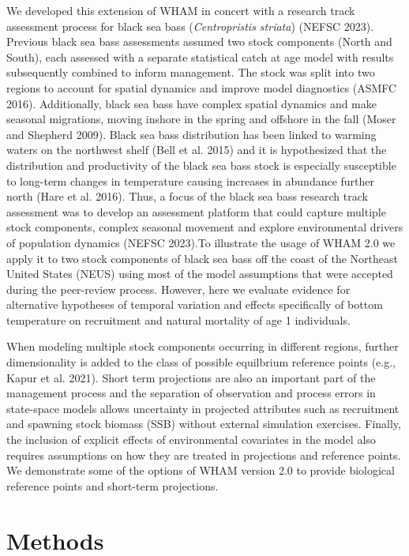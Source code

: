 \documentclass[
]{article}
\begin{document}
We developed this extension of WHAM in concert with a research track assessment process for black sea bass (\textit{Centropristis striata}) (NEFSC 2023). Previous black sea bass assessments assumed two stock components (North and South), each assessed with a separate statistical catch at age model with results subsequently combined to inform management. The stock was split into two regions to account for spatial dynamics and improve model diagnostics (ASMFC 2016). Additionally, black sea bass have complex spatial dynamics and make seasonal migrations, moving inshore in the spring and offshore in the fall (Moser and Shepherd 2009). Black sea bass distribution has been linked to warming waters on the northwest shelf (Bell et al. 2015) and it is hypothesized that the distribution and productivity of the black sea bass stock is especially susceptible to long-term changes in temperature causing increases in abundance further north (Hare et al. 2016). Thus, a focus of the black sea bass research track assessment was to develop an assessment platform that could capture multiple stock components, complex seasonal movement and explore environmental drivers of population dynamics (NEFSC 2023).To illustrate the usage of WHAM 2.0 we apply it to two stock components of black sea bass off the coast of the Northeast United States (NEUS) using most of the model assumptions that were accepted during the peer-review process. However, here we evaluate evidence for alternative hypotheses of temporal variation and effects specifically of bottom temperature on recruitment and natural mortality of age 1 individuals.

When modeling multiple stock components occurring in different regions, further dimensionality is added to the class of possible equilbrium reference points (e.g., Kapur et al. 2021). Short term projections are also an important part of the management process and the separation of observation and process errors in state-space models allows uncertainty in projected attributes such as recruitment and spawning stock biomass (SSB) without external simulation exercises. Finally, the inclusion of explicit effects of environmental covariates in the model also requires assumptions on how they are treated in projections and reference points. We demonstrate some of the options of WHAM version 2.0 to provide biological reference points and short-term projections.

\hypertarget{methods}{%
\section*{Methods}\label{methods}}
\end{document}
